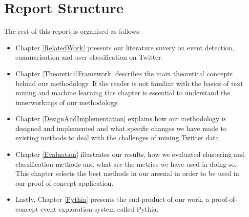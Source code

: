 \section{Report Structure}
The rest of this report is organised as follows:
\begin{itemize}
   \item Chapter \ref{RelatedWork} presents our literature suvery on event detection, summarisation and user classification on Twitter. 
   \item Chapter \ref{TheoreticalFramework} describes the main theoretical concepts behind our methodology. If the reader is not familiar with 
   the basics of text mining and machine learning this chapter is essential to understand the innerworkings of our methodology. 
   \item  Chapter \ref{DesignAndImplementation} explains how our methodology is designed and implemented and what specific changes we have made to existing methods
   to deal with the challenges of mining Twitter data. 
   \item Chapter \ref{Evaluation} illustrates our results, how we evaluated clustering and classification methods and what are the metrics we have used in doing so. This chapter
   selects the best methods in our arsenal in order to be used in our proof-of-concept application. 
   \item Lastly, Chapter \ref{Pythia} presents the end-product of our work, a proof-of-concept event exploration system called Pythia. 
 \end{itemize} 


